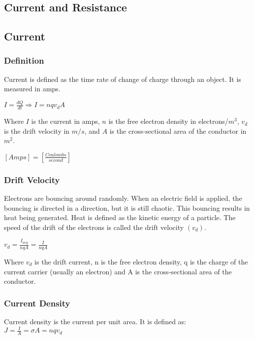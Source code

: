\begin{center}
    \section{Current and Resistance}
    \hrulefill
    \subsection*{Current}
\end{center}

\subsubsection*{Definition}
\hspace{.5cm} Current is defined as the time rate of change of charge through an object. It is measured in amps.

\vbox{
    \center
    $I=\frac{dQ}{dt} \Rightarrow I = nqv_dA$
}\vspace{12pt}

Where $I$ is the current in amps, $n$ is the free electron density in electrons/$m^3$, 
$v_d$ is the drift velocity in $m/s$, and $A$ is the cross-sectional area of the conductor in $m^2$.

\vbox {
    \center
    $[Amps] = [\frac{Coulombs}{second}]$
}


\subsubsection*{Drift Velocity}
Electrons are bouncing around randomly. When an electric field is applied, the bouncing is directed 
in a direction, but it is still chaotic. This bouncing results in heat being generated. Heat is defined 
as the kinetic energy of a particle. The speed of the drift of the electrons is called the drift velocity $(v_d)$.

\vbox{
    \center
    $v_d = \frac{I_{avg}}{nqA} = \frac{I}{nqA}$\\
}\vspace{12pt}

Where $v_d$ is the drift current, n is the free electron density, q is the charge of the current carrier 
(usually an electron) and A is the cross-sectional area of the conductor.


\pagebreak



\subsubsection*{Current Density}
\hspace{.5cm} Current density is the current per unit area. It is defined as:\\
\vbox{
    \center
    $J = \frac{I}{A} = \sigma A = nqv_d$
}\vspace{12pt}


